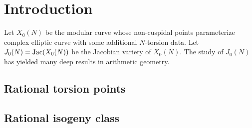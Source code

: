 \chapter{Introduction}%
\label{chap:intro}

Let $X_0(N)$ be the modular curve whose non-cuspidal points parameterize
complex elliptic curve with some additional $N$-torsion data. Let
$J_0(N)=\operatorname{Jac}(X_0(N))$ be the Jacobian variety of $X_0(N)$. The study of
$J_0(N)$ has yielded many deep results in arithmetic geometry.

\section{Rational torsion points}%
\label{sec:rational_torsion_points}


\section{Rational isogeny class}%
\label{sec:rational_isogeny_class}

